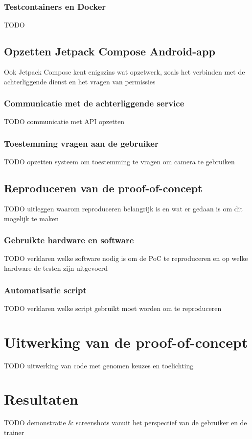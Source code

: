 \subsubsection{Testcontainers en Docker}
TODO

\subsection{Opzetten Jetpack Compose Android-app}
\label{subsec:opzetten-jetpack-compose-android-app}
Ook Jetpack Compose kent enigszins wat opzetwerk, zoals het verbinden met de achterliggende dienst en het vragen van permissies  %

\subsubsection{Communicatie met de achterliggende service}
TODO communicatie met API opzetten %

\subsubsection{Toestemming vragen aan de gebruiker}
TODO opzetten systeem om toestemming te vragen om camera te gebruiken %

\subsection{Reproduceren van de proof-of-concept}
\label{subsec:reproduceren-van-de-proof-of-concept}
TODO uitleggen waarom reproduceren belangrijk is en wat er gedaan is om dit mogelijk te maken

\subsubsection{Gebruikte hardware en software}
TODO verklaren welke software nodig is om de PoC te reproduceren en op welke hardware de testen zijn uitgevoerd

\subsubsection{Automatisatie script}
TODO verklaren welke script gebruikt moet worden om te reproduceren

\section{Uitwerking van de proof-of-concept}
\label{sec:uitwerking-van-de-proof-of-concept}
TODO uitwerking van code met genomen keuzes en toelichting

\section{Resultaten}
\label{sec:resultaten}
TODO demonstratie \& screenshots vanuit het perspectief van de gebruiker en de trainer